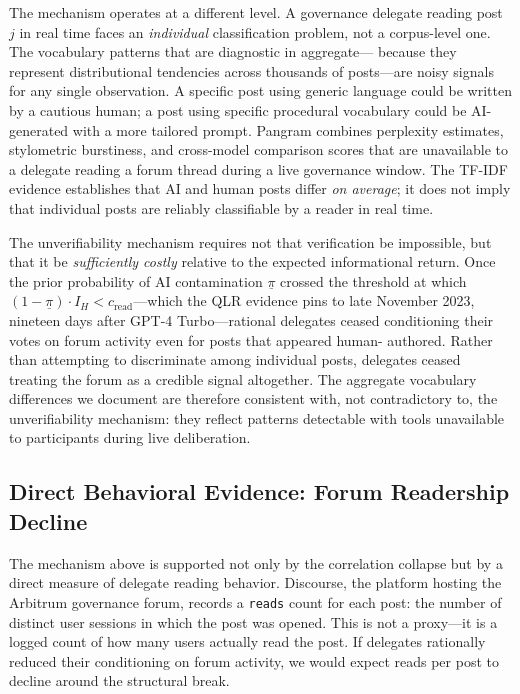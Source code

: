 \documentclass[12pt]{article}
\begin{document}
The mechanism operates at a different level. A governance delegate reading post
$j$ in real time faces an \emph{individual} classification problem, not a
corpus-level one. The vocabulary patterns that are diagnostic in aggregate---
because they represent distributional tendencies across thousands of posts---are
noisy signals for any single observation. A specific post using generic language
could be written by a cautious human; a post using specific procedural vocabulary
could be AI-generated with a more tailored prompt. Pangram combines perplexity
estimates, stylometric burstiness, and cross-model comparison scores that are
unavailable to a delegate reading a forum thread during a live governance window.
The TF-IDF evidence establishes that AI and human posts differ \emph{on average};
it does not imply that individual posts are reliably classifiable by a reader in
real time.

The unverifiability mechanism requires not that verification be impossible, but that it be
\emph{sufficiently costly} relative to the expected informational return. Once the
prior probability of AI contamination $\underline{\pi}$ crossed the threshold at
which $(1 - \underline{\pi}) \cdot I_H < c_{\text{read}}$---which the QLR evidence pins
to late November 2023, nineteen days after GPT-4 Turbo---rational delegates ceased
conditioning their votes on forum activity even for posts that appeared human-
authored. Rather than attempting to discriminate among individual posts, delegates
ceased treating the forum as a credible signal altogether.
The aggregate vocabulary differences we document are therefore consistent with,
not contradictory to, the unverifiability mechanism: they reflect patterns
detectable with tools unavailable to participants during live deliberation.

\subsection{Direct Behavioral Evidence: Forum Readership Decline}
\label{sec:reads}

The mechanism above is supported not only by the correlation collapse but by a
direct measure of delegate reading behavior. Discourse, the platform hosting the
Arbitrum governance forum, records a \texttt{reads} count for each post: the
number of distinct user sessions in which the post was opened. This is not a
proxy---it is a logged count of how many users actually read the post. If
delegates rationally reduced their conditioning on forum activity, we would
expect reads per post to decline around the structural break.
\end{document}
